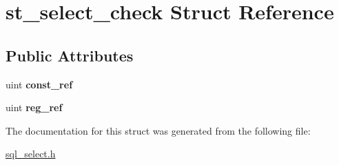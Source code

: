 \hypertarget{structst__select__check}{}\section{st\+\_\+select\+\_\+check Struct Reference}
\label{structst__select__check}
\subsection*{Public Attributes}
\begin{DoxyCompactItemize}
\item 
\mbox{\label{structst__select__check_aaad29409985ba50c96bddc81eb012ab3}} 
uint {\bfseries const\+\_\+ref}
\item 
\mbox{\label{structst__select__check_a345b0352abdd1941bf18ba11218b35ac}} 
uint {\bfseries reg\+\_\+ref}
\end{DoxyCompactItemize}


The documentation for this struct was generated from the following file\+:\begin{DoxyCompactItemize}
\item 
\mbox{\hyperlink{sql__select_8h}{sql\+\_\+select.\+h}}\end{DoxyCompactItemize}
